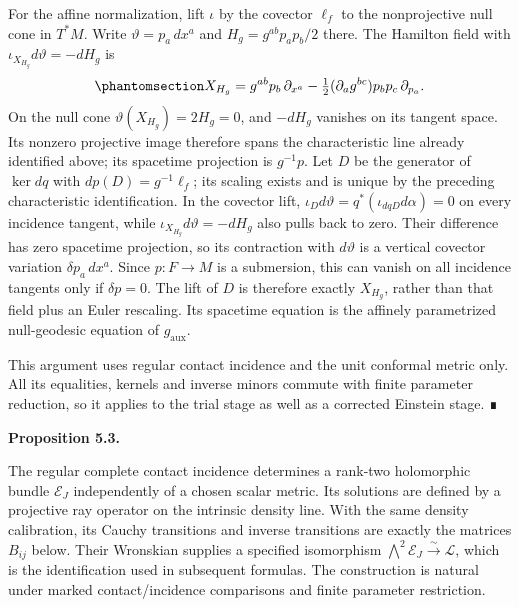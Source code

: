 \documentclass[
  english,
  11pt,
  reqno]{amsart}
\makeatletter
\newcommand{\pandocstatementheading}[1]{%
  \par\addpenalty{\@beginparpenalty}%
  \addvspace{.5\baselineskip plus .2\baselineskip minus .2\baselineskip}%
  {\normalfont\bfseries #1\par}%
  \nobreak\@afterindenttrue\@afterheading
}
\makeatother
\begin{document}
For the affine normalization, lift \(\iota\) by the covector \(\ell_f\)
to the nonprojective null cone in \(T^*M\). Write
\(\vartheta=p_a\,dx^a\) and \(H_g=g^{ab}p_ap_b/2\) there. The Hamilton
field with \(\iota_{X_{H_g}}d\vartheta=-dH_g\) is
\begin{equation}\protect\phantomsection\label{eq:gg-trial-affine-hamiltonian}{
 X_{H_g}=g^{ab}p_b\,\partial_{x^a}
          -\tfrac12(\partial_a g^{bc})p_bp_c\,\partial_{p_a}.
}\end{equation} On the null cone \(\vartheta(X_{H_g})=2H_g=0\), and
\(-dH_g\) vanishes on its tangent space. Its nonzero projective image
therefore spans the characteristic line already identified above; its
spacetime projection is \(g^{-1}p\). Let \(D\) be the generator of
\(\ker dq\) with \(dp(D)=g^{-1}\ell_f\); its scaling exists and is
unique by the preceding characteristic identification. In the covector
lift, \(\iota_Dd\vartheta=q^*(\iota_{dqD}d\alpha)=0\) on every incidence
tangent, while \(\iota_{X_{H_g}}d\vartheta=-dH_g\) also pulls back to
zero. Their difference has zero spacetime projection, so its contraction
with \(d\vartheta\) is a vertical covector variation
\(\delta p_a\,dx^a\). Since \(p:F\to M\) is a submersion, this can
vanish on all incidence tangents only if \(\delta p=0\). The lift of
\(D\) is therefore exactly \(X_{H_g}\), rather than that field plus an
Euler rescaling. Its spacetime equation is the affinely parametrized
null-geodesic equation of \(g_{\mathrm{aux}}\).

This argument uses regular contact incidence and the unit conformal
metric only. All its equalities, kernels and inverse minors commute with
finite parameter reduction, so it applies to the trial stage as well as
a corrected Einstein stage. ∎

\pandocstatementheading{\protect{}\label{prop:gg-intrinsic-optical}Proposition 5.3.}

The regular complete contact incidence determines a rank-two holomorphic
bundle \(\mathcal E_J\) independently of a chosen scalar metric. Its
solutions are defined by a projective ray operator on the intrinsic
density line. With the same density calibration, its Cauchy transitions
and inverse transitions are exactly the matrices \(B_{ij}\) below. Their
Wronskian supplies a specified isomorphism
\(\bigwedge^2\mathcal E_J\xrightarrow{\sim}\mathcal L\), which is the
identification used in subsequent formulas. The construction is natural
under marked contact/incidence comparisons and finite parameter
restriction.
\end{document}
